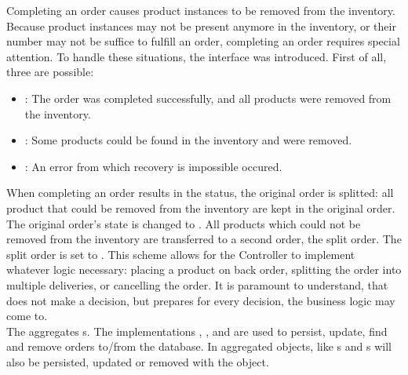 Completing an order causes product instances to be removed from the inventory.
Because product instances may not be present anymore in the inventory, or their number may not be suffice to fulfill an order, completing an order requires special attention.
To handle these situations, the  interface was introduced.
First of all, three  are possible:

\begin{itemize}
\item {}: The order was completed successfully, and all products were removed from the inventory. 
\item {}: Some products could be found in the inventory and were removed.
\item {}: An error from which recovery is impossible occured.
\end{itemize}

When completing an order results in the  status, the original order is splitted: all product that could be removed from the inventory are kept in the original order.
The original order's state is changed to .
All products which could not be removed from the inventory are transferred to a second order, the split order. The split order is set to .
This scheme allows for the Controller to implement whatever logic necessary: placing a product on back order, splitting the order into multiple deliveries, or cancelling the order.
It is paramount to understand, that  does not make a decision, but prepares for every decision, the business logic may come to.
\\

The  aggregates s.
The implementations , , and  are used to persist, update, find and remove orders to/from the database.
In  aggregated objects, like s and s will also be persisted, updated or removed with the  object.

